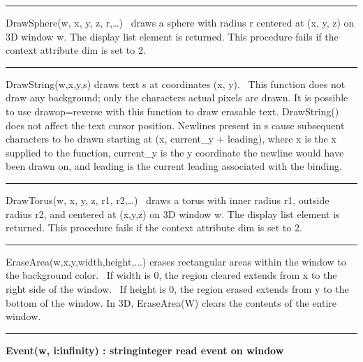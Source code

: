 \bigskip\hrule\vspace{0.1cm}

\noindent
\textsf{DrawSphere(w, x, y, z, r,{\dots})} \ draws a sphere with radius
r centered at (x, y, z) on 3D window w. The display list element is
returned. This procedure fails if the context attribute \textsf{dim} is
set to 2.

\bigskip\hrule\vspace{0.1cm}

\noindent
\textsf{DrawString(w,x,y,s)} draws text \textsf{s} at coordinates (x,
y). \ This function does not draw any background; only the
characters{\textquotesingle} actual pixels are drawn. It is possible to
use \textsf{{\textquotedbl}drawop=reverse{\textquotedbl}} with this
function to draw erasable text. \textsf{DrawString()} does not affect
the text cursor position. Newlines present in \textsf{s} cause
subsequent characters to be drawn starting at (\textsf{x, current\_y +
leading}), where \textsf{x} is the \textsf{x} supplied to the function,
\textsf{current\_y} is the \textsf{y} coordinate the newline would have
been drawn on, and leading is the current leading associated with the
binding.

\bigskip\hrule\vspace{0.1cm}

\noindent
\textsf{DrawTorus(w, x, y, z, r1, r2,{\dots})} \ draws a torus with
inner radius \textsf{r1}, outside radius \textsf{r2}, and centered at
(\textsf{x,y,z}) on 3D window \textsf{w}. The display list element is
returned. This procedure fails if the context attribute \textsf{dim} is
set to 2.

\bigskip\hrule\vspace{0.1cm}

\noindent
\textsf{EraseArea(w,x,y,width,height,...)} erases rectangular areas
within the window to the background color. \ If \textsf{width} is 0,
the region cleared extends from \textsf{x} to the right side of the
window. \ If \textsf{height} is 0, the region erased extends from
\textsf{y} to the bottom of the window. In 3D, \textsf{EraseArea(W)}
clears the contents of the entire window.

\bigskip\hrule\vspace{0.1cm}
\noindent
{\bf Event(w, i:infinity) : string{\textbar}integer \hfill
 read event on window}

